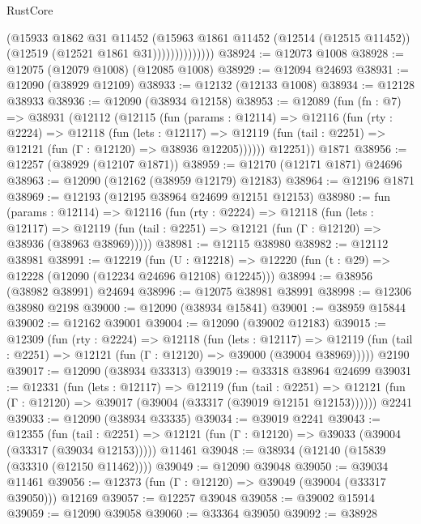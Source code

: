\begin{lexlean}{RustCore}
\begin{coremodule}
                        (@15933
                          @1862
                          @31
                          @11452
                          (@15963
                            @1861
                            @11452
                            (@12514 (@12515 @11452))
                            (@12519 (@12521 @1861 @31))))))))))))))
@38924 := @12073 @1008
@38928 := @12075 (@12079 @1008) (@12085 @1008)
@38929 := @12094 @24693
@38931 := @12090 (@38929 @12109)
@38933 := @12132 (@12133 @1008)
@38934 := @12128 @38933
@38936 := @12090 (@38934 @12158)
@38953 := @12089
    (fun (fn : @7) =>
    @38931
      (@12112
        (@12115
          (fun (params : @12114) =>
          @12116
            (fun (rty : @2224) =>
            @12118
              (fun (lets : @12117) =>
              @12119 (fun (tail : @2251) => @12121 (fun (Γ : @12120) => @38936 @12205))))))
        @12251))
    @1871
@38956 := @12257 (@38929 (@12107 @1871))
@38959 := @12170 (@12171 @1871) @24696
@38963 := @12090 (@12162 (@38959 @12179) @12183)
@38964 := @12196 @1871
@38969 := @12193 (@12195 @38964 @24699 @12151 @12153)
@38980 := fun (params : @12114) =>
  @12116
    (fun (rty : @2224) =>
    @12118
      (fun (lets : @12117) =>
      @12119 (fun (tail : @2251) => @12121 (fun (Γ : @12120) => @38936 (@38963 @38969)))))
@38981 := @12115 @38980
@38982 := @12112 @38981
@38991 := @12219
    (fun (U : @12218) => @12220 (fun (t : @29) => @12228 (@12090 (@12234 @24696 @12108) @12245)))
@38994 := @38956 (@38982 @38991) @24694
@38996 := @12075 @38981 @38991
@38998 := @12306 @38980 @2198
@39000 := @12090 (@38934 @15841)
@39001 := @38959 @15844
@39002 := @12162 @39001
@39004 := @12090 (@39002 @12183)
@39015 := @12309
    (fun (rty : @2224) =>
    @12118
      (fun (lets : @12117) =>
      @12119 (fun (tail : @2251) => @12121 (fun (Γ : @12120) => @39000 (@39004 @38969)))))
    @2190
@39017 := @12090 (@38934 @33313)
@39019 := @33318 @38964 @24699
@39031 := @12331
    (fun (lets : @12117) =>
    @12119
      (fun (tail : @2251) =>
      @12121 (fun (Γ : @12120) => @39017 (@39004 (@33317 (@39019 @12151 @12153))))))
    @2241
@39033 := @12090 (@38934 @33335)
@39034 := @39019 @2241
@39043 := @12355
    (fun (tail : @2251) => @12121 (fun (Γ : @12120) => @39033 (@39004 (@33317 (@39034 @12153)))))
    @11461
@39048 := @38934 (@12140 (@15839 (@33310 (@12150 @11462))))
@39049 := @12090 @39048
@39050 := @39034 @11461
@39056 := @12373 (fun (Γ : @12120) => @39049 (@39004 (@33317 @39050))) @12169
@39057 := @12257 @39048
@39058 := @39002 @15914
@39059 := @12090 @39058
@39060 := @33364 @39050
@39092 := @38928

\end{coremodule}
\end{lexlean}
